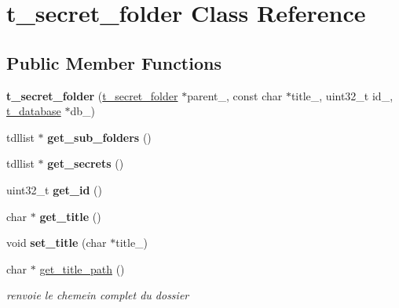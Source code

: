 \hypertarget{classt__secret__folder}{}\section{t\+\_\+secret\+\_\+folder Class Reference}
\label{classt__secret__folder}
\subsection*{Public Member Functions}
\begin{DoxyCompactItemize}
\item 
\mbox{\label{classt__secret__folder_a691e59080af66df30e9ec59cf517379c}} 
{\bfseries t\+\_\+secret\+\_\+folder} (\hyperlink{classt__secret__folder}{t\+\_\+secret\+\_\+folder} $\ast$parent\+\_\+, const char $\ast$title\+\_\+, uint32\+\_\+t id\+\_\+, \hyperlink{classt__database}{t\+\_\+database} $\ast$db\+\_\+)
\item 
\mbox{\label{classt__secret__folder_aad736064c28b260b7869826b6157ecd8}} 
tdllist $\ast$ {\bfseries get\+\_\+sub\+\_\+folders} ()
\item 
\mbox{\label{classt__secret__folder_a396ed8a40ecd46608075543a5b0084eb}} 
tdllist $\ast$ {\bfseries get\+\_\+secrets} ()
\item 
\mbox{\label{classt__secret__folder_a4c5d16701b8ce3bf9ca85d2fcf4f25e9}} 
uint32\+\_\+t {\bfseries get\+\_\+id} ()
\item 
\mbox{\label{classt__secret__folder_a64c7226b4f3328ca5b6852de59538197}} 
char $\ast$ {\bfseries get\+\_\+title} ()
\item 
\mbox{\label{classt__secret__folder_adca8a37160f6b24f7c5e2e1e8c9b0e31}} 
void {\bfseries set\+\_\+title} (char $\ast$title\+\_\+)
\item 
char $\ast$ \hyperlink{classt__secret__folder_a6e853312c39540414f50ba796f9961da}{get\+\_\+title\+\_\+path} ()
\begin{DoxyCompactList}\small\item\em renvoie le chemein complet du dossier \end{DoxyCompactList}\item 

\end{DoxyCompactItemize}
